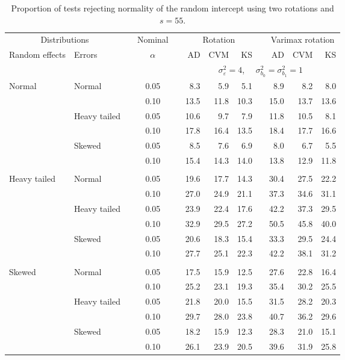 \begin{table}[ht]
\centering
\caption{\label{tab:fixedsimb055} Proportion of tests rejecting normality of the random intercept using two rotations and $s = 55$.}
\begin{scriptsize}
\begin{tabular}{ll p{.1cm} c p{.1cm} rrr p{.1cm} rrr}
  \hline
  \multicolumn{2}{c}{Distributions}& & Nominal & &  \multicolumn{3}{c}{Rotation} & & \multicolumn{3}{c}{Varimax rotation} \\ \cline{1-2} \cline{6-8} \cline{10-12}   
  Random effects & Errors & & $\alpha$ & & AD & CVM & KS & & AD & CVM & KS \\ 
   \hline
& && && \multicolumn{7}{c}{$\sigma_{\varepsilon}^2 = 4$, \ \ $\sigma_{b_0}^2 = \sigma_{b_1}^2 = 1$} \\ \cline{6-12}
\rowcolor{gray!20} Normal & Normal &  & 0.05 &  & 8.3 & 5.9 & 5.1 &  & 8.9 & 8.2 & 8.0 \\ 
\rowcolor{gray!20}    &  &  & 0.10 &  & 13.5 & 11.8 & 10.3 &  & 15.0 & 13.7 & 13.6 \\ 
\rowcolor{gray!20}    & Heavy tailed &  & 0.05 &  & 10.6 & 9.7 & 7.9 &  & 11.8 & 10.5 & 8.1 \\ 
\rowcolor{gray!20}    &  &  & 0.10 &  & 17.8 & 16.4 & 13.5 &  & 18.4 & 17.7 & 16.6 \\ 
\rowcolor{gray!20}    & Skewed &  & 0.05 &  & 8.5 & 7.6 & 6.9 &  & 8.0 & 6.7 & 5.5 \\ 
\rowcolor{gray!20}    &  &  & 0.10 &  & 15.4 & 14.3 & 14.0 &  & 13.8 & 12.9 & 11.8 \\ 
&&&&&&&&&&&\\
  Heavy tailed & Normal &  & 0.05 &  & 19.6 & 17.7 & 14.3 &  & 30.4 & 27.5 & 22.2 \\ 
  &  &  & 0.10 &  & 27.0 & 24.9 & 21.1 &  & 37.3 & 34.6 & 31.1 \\ 
  & Heavy tailed &  & 0.05 &  & 23.9 & 22.4 & 17.6 &  & 42.2 & 37.3 & 29.5 \\ 
  &  &  & 0.10 &  & 32.9 & 29.5 & 27.2 &  & 50.5 & 45.8 & 40.0 \\ 
  & Skewed &  & 0.05 &  & 20.6 & 18.3 & 15.4 &  & 33.3 & 29.5 & 24.4 \\ 
  &  &  & 0.10 &  & 27.7 & 25.1 & 22.3 &  & 42.2 & 38.1 & 31.2 \\ 
 &&&&&&&&&&&\\ 
    Skewed & Normal &  & 0.05 &  & 17.5 & 15.9 & 12.5 &  & 27.6 & 22.8 & 16.4 \\ 
 &  &  & 0.10 &  & 25.2 & 23.1 & 19.3 &  & 35.4 & 30.2 & 25.5 \\ 
 & Heavy tailed &  & 0.05 &  & 21.8 & 20.0 & 15.5 &  & 31.5 & 28.2 & 20.3 \\ 
 &  &  & 0.10 &  & 29.7 & 28.0 & 23.8 &  & 40.7 & 36.2 & 29.6 \\ 
 & Skewed &  & 0.05 &  & 18.2 & 15.9 & 12.3 &  & 28.3 & 21.0 & 15.1 \\ 
 &  &  & 0.10 &  & 26.1 & 23.9 & 20.5 &  & 39.6 & 31.9 & 25.8 \\ 



\end{tabular}
\end{scriptsize}
\end{table}
